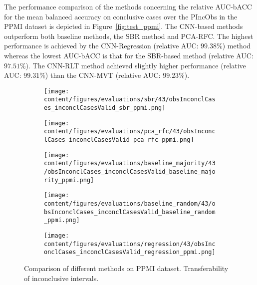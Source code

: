 The performance comparison of the methods concerning the relative AUC-bACC for the mean balanced accuracy on conclusive cases 
over the PIncObs in the PPMI dataset is depicted in Figure~\ref{fig:test_ppmi}.
The CNN-based methods outperform both baseline methods, the SBR method and PCA-RFC.
The highest performance is achieved by the CNN-Regression (relative AUC: $99.38\%$) method 
whereas the lowest AUC-bACC is that for the SBR-based method (relative AUC: $97.51\%$).
The CNN-RLT method achieved slightly higher performance (relative AUC: $99.31\%$) than the CNN-MVT (relative AUC: $99.23\%$).


\begin{figure}[ht]
  \begin{subfigure}{0.5\textwidth}
    \centering
    \texttt{[image: content/figures/evaluations/sbr/43/obsInconclCases\_inconclCasesValid\_sbr\_ppmi.png]}
  \end{subfigure}
  \hfill
  \begin{subfigure}{0.5\textwidth}
    \centering
    \texttt{[image: content/figures/evaluations/pca\_rfc/43/obsInconclCases\_inconclCasesValid\_pca\_rfc\_ppmi.png]}
  \end{subfigure}
  \hfill
  \begin{subfigure}{0.5\textwidth}
    \centering
    \texttt{[image: content/figures/evaluations/baseline\_majority/43/obsInconclCases\_inconclCasesValid\_baseline\_majority\_ppmi.png]}
  \end{subfigure}
  \hfill
  \begin{subfigure}{0.5\textwidth}
    \centering
    \texttt{[image: content/figures/evaluations/baseline\_random/43/obsInconclCases\_inconclCasesValid\_baseline\_random\_ppmi.png]}
  \end{subfigure}
  \hfill
  \begin{subfigure}{0.5\textwidth}
    \centering
    \texttt{[image: content/figures/evaluations/regression/43/obsInconclCases\_inconclCasesValid\_regression\_ppmi.png]}
  \end{subfigure}

  \caption{Comparison of different methods on PPMI dataset. Transferability of inconclusive intervals.}
  \label{fig:test_interval_match_ppmi}
\end{figure}

